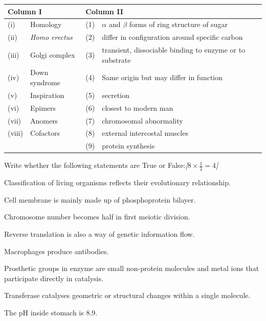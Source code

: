 \documentclass[11pt,a4paper]{article}
\newcommand{\pts}[1]{\hfill   \textit{[#1]}}
\begin{document}
\begin{parts}
\begin{center}
\begin{tabular}{lp{4cm}lp{7.5cm}}
      \hline
      \multicolumn{2}{l}{   \textbf{Column I}} & \multicolumn{2}{l}{   \textbf{Column II}} \\
      \hline
      (i) & Homology & (1) & $\alpha$ and $\beta$ forms of ring structure of sugar \\
      (ii) &   \textit{Homo erectus} & (2) & differ in configuration around specific carbon \\
      (iii) & Golgi complex & (3) & transient, dissociable binding to enzyme or to substrate \\
      (iv) & Down syndrome & (4) & Same origin but may differ in function \\
      (v) & Inspiration & (5) & secretion \\
      (vi) & Epimers & (6) & closest to modern man \\
      (vii) & Anomers & (7) & chromosomal abnormality \\
      (viii) & Cofactors & (8) & external intercostal muscles \\
      & & (9) & protein synthesis \\
      \hline
    \end{tabular}
  \end{center}

  \item Write whether the following statements are True or False:\pts{$8  \times \frac{1}{2} = 4$}
  
\begin{parts}
    \item Classification of living organisms reflects their evolutionary relationship.
    \item Cell membrane is mainly made up of phosphoprotein bilayer.
    \item Chromosome number becomes half in first meiotic division.
    \item Reverse translation is also a way of genetic information flow.
    \item Macrophages produce antibodies.
    \item Prosthetic groups in enzyme are small non-protein molecules and metal ions that participate directly in catalysis.
    \item Transferase catalyses geometric or structural changes within a single molecule.
    \item The pH inside stomach is 8.9.
  \end{parts}


\end{parts}
\end{document}
